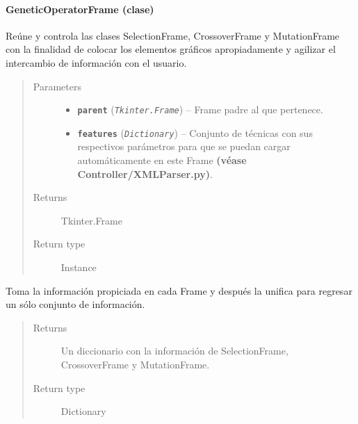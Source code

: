 \documentclass[class=report, crop=false]{standalone}
\begin{document}
\paragraph{GeneticOperatorFrame (clase)}
\label{sec:a_3_2_5_1}
\begin{fulllineitems}

\begin{DUlineblock}{0em}
\item[] Reúne y controla las clases SelectionFrame, CrossoverFrame y  
MutationFrame con la finalidad de colocar los elementos gráficos apropiadamente y 
agilizar el intercambio de información con el usuario.
\end{DUlineblock}

\begin{quote}\begin{description}
\item[{Parameters}] \leavevmode\begin{itemize}
\item \textbf{\texttt{parent}} (\emph{\texttt{Tkinter.Frame}}) -- Frame padre al que pertenece.
\item \textbf{\texttt{features}} (\emph{\texttt{Dictionary}}) -- Conjunto de técnicas con sus respectivos parámetros para que se puedan cargar automáticamente en este Frame \textbf{(véase Controller/XMLParser.py)}.
\end{itemize}

\item[{Returns}] \leavevmode
Tkinter.Frame
\item[{Return type}] \leavevmode
Instance
\end{description}\end{quote}


\begin{fulllineitems}

Toma la información propiciada en cada Frame y 
después la unifica para regresar un sólo conjunto 
de información.

\begin{quote}\begin{description}
\item[{Returns}] \leavevmode
Un diccionario con la información de SelectionFrame, CrossoverFrame y MutationFrame.
\item[{Return type}] \leavevmode
Dictionary
\end{description}\end{quote}


\end{fulllineitems}
\end{fulllineitems}
\end{document}
